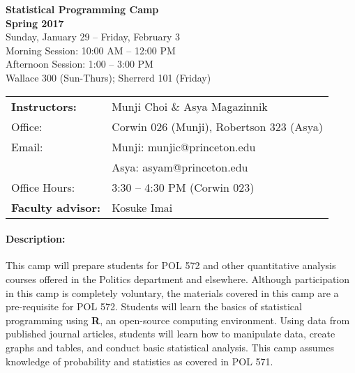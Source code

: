 \documentclass[12pt]{article}
\begin{document}
\thispagestyle{empty}
\begin{center}
  {\bf \Large{{Statistical Programming Camp \\ Spring 2017}}}\\
  \vspace{.1in}
   Sunday, January 29 -- Friday,  February 3 \\
    Morning Session: 10:00
    AM -- 12:00 PM\\
   Afternoon Session: 1:00 -- 3:00 PM \\ Wallace 300 (Sun-Thurs); Sherrerd 101 (Friday)
\end{center}


\newcommand{\R}{\textsf{\textbf{R}}}
\newcommand{\QSS}{\textsf{QSS}}
\newcommand{\Rst}{\textsf{\textbf{RStudio}}}


\hrulefill

\begin{tabular}{ll}
{\bf Instructors:}  & Munji Choi \& Asya Magazinnik \\
Office:& Corwin 026 (Munji), Robertson 323 (Asya) \\
Email:  & Munji: munjic@princeton.edu\\
& Asya: asyam@princeton.edu\\
Office Hours:&  3:30 -- 4:30 PM (Corwin 023) \\
{\bf Faculty advisor:}& Kosuke Imai
\end{tabular}


\hrulefill

\paragraph{Description:} This camp will prepare students for POL 572
and other quantitative analysis courses offered in the Politics
department and elsewhere.  Although participation in this camp is
completely voluntary, the materials covered in this camp are a
pre-requisite for POL 572.  Students will learn the basics of
statistical programming using \R, an open-source computing
environment.  Using data from published journal articles, students
will learn how to manipulate data, create graphs and tables, and
conduct basic statistical analysis. This camp assumes knowledge of
probability and statistics as covered in POL 571.
\end{document}
